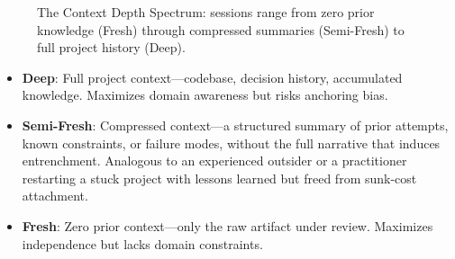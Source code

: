 \documentclass[11pt]{article}
\begin{document}
\begin{figure}[t]
\centering
{}
\caption{The Context Depth Spectrum: sessions range from zero prior knowledge (Fresh) through compressed summaries (Semi-Fresh) to full project history (Deep).}
\label{fig:spectrum}
\end{figure}

\begin{itemize}[leftmargin=1.5em]
  \item \textbf{Deep}: Full project context---codebase, decision history, accumulated knowledge. Maximizes domain awareness but risks anchoring bias.
  \item \textbf{Semi-Fresh}: Compressed context---a structured summary of prior attempts, known constraints, or failure modes, without the full narrative that induces entrenchment. Analogous to an experienced outsider or a practitioner restarting a stuck project with lessons learned but freed from sunk-cost attachment.
  \item \textbf{Fresh}: Zero prior context---only the raw artifact under review. Maximizes independence but lacks domain constraints.
\end{itemize}
\end{document}
